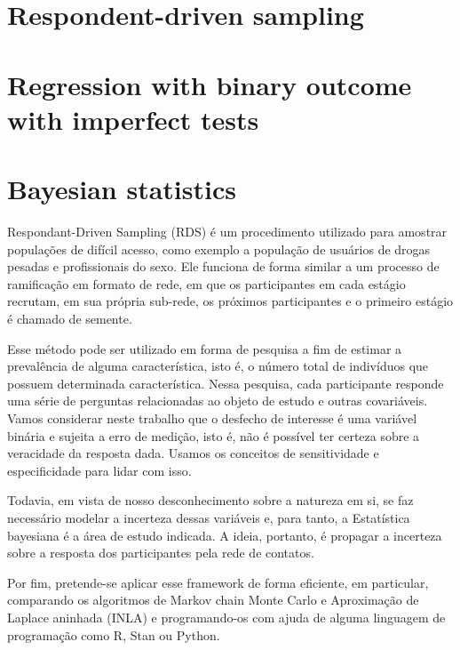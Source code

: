 

\section{Respondent-driven sampling}


\section{Regression with binary outcome with imperfect tests}


\section{Bayesian statistics}

Respondant-Driven Sampling (RDS) é um procedimento utilizado para amostrar
populações de difícil acesso, como exemplo a população de usuários de drogas
pesadas e profissionais do sexo. Ele funciona de forma similar a um processo de
ramificação em formato de rede, em que os participantes em cada estágio recrutam,
em sua própria sub-rede, os próximos participantes e o primeiro estágio é chamado de
semente.

Esse método pode ser utilizado em forma de pesquisa a fim de estimar a
prevalência de alguma característica, isto é, o número total de indivíduos que
possuem determinada característica. Nessa pesquisa, cada participante responde uma
série de perguntas relacionadas ao objeto de estudo e outras covariáveis. Vamos
considerar neste trabalho que o desfecho de interesse é uma variável binária e sujeita
a erro de medição, isto é, não é possível ter certeza sobre a veracidade da resposta
dada. Usamos os conceitos de sensitividade e especificidade para lidar com
isso.

Todavia, em vista de nosso desconhecimento sobre a natureza em si, se faz
necessário modelar a incerteza dessas variáveis e, para tanto, a Estatística bayesiana é
a área de estudo indicada. A ideia, portanto, é propagar a incerteza sobre a resposta
dos participantes pela rede de contatos.

Por fim, pretende-se aplicar esse framework de forma eficiente, em particular,
comparando os algoritmos de Markov chain Monte Carlo e Aproximação de Laplace
aninhada (INLA) e programando-os com ajuda de alguma linguagem de programação
como R, Stan ou Python.